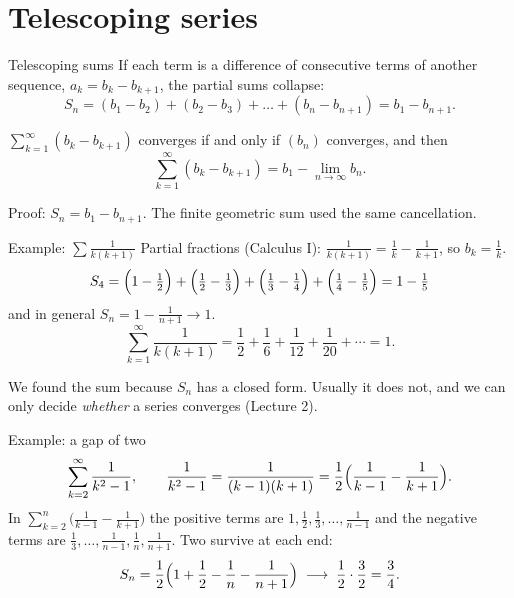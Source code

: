 \documentclass[10pt]{wosm-slides}
\begin{document}
\section{Telescoping series}

\begin{frame}{Telescoping sums}
  If each term is a difference of consecutive terms of another sequence,
  $a_k = b_k - b_{k+1}$, the partial sums collapse:
  \[ S_n = (b_1 - b_2) + (b_2 - b_3) + \dots + (b_n - b_{n+1}) = b_1 - b_{n+1} . \]
  \pause
  \begin{theorem}
    $\sum_{k=1}^\infty (b_k - b_{k+1})$ converges if and only if $(b_n)$ converges, and then
    \[ \sum_{k=1}^\infty (b_k - b_{k+1}) = b_1 - \lim_{n\to\infty} b_n . \]
  \end{theorem}
  {\small Proof: $S_n = b_1 - b_{n+1}$. \quad
  The finite geometric sum used the same cancellation.\par}
\end{frame}

\begin{frame}{Example: $\sum \frac{1}{k(k+1)}$}
  Partial fractions (Calculus I): \quad
  $\displaystyle\frac{1}{k(k+1)} = \frac1k - \frac1{k+1}$, \quad so $b_k = \frac1k$.
  \pause
  \[ S_4 = \Bigl(1 - \tfrac12\Bigr) + \Bigl(\tfrac12 - \tfrac13\Bigr)
         + \Bigl(\tfrac13 - \tfrac14\Bigr) + \Bigl(\tfrac14 - \tfrac15\Bigr)
         = 1 - \tfrac15 \]
  and in general $S_n = 1 - \frac{1}{n+1} \to 1$.
  \pause
  \[ \sum_{k=1}^\infty \frac{1}{k(k+1)} = \frac12 + \frac16 + \frac1{12} + \frac1{20} + \cdots = 1 . \]
  {\small\color{wosm-muted} We found the sum because $S_n$ has a closed form. Usually it does
  not, and we can only decide \emph{whether} a series converges (Lecture 2).\par}
\end{frame}

\begin{frame}{Example: a gap of two}
  \[ \sum_{k=2}^\infty \frac{1}{k^2 - 1}, \qquad
     \frac{1}{k^2-1} = \frac{1}{(k-1)(k+1)} = \frac12\Bigl(\frac{1}{k-1} - \frac{1}{k+1}\Bigr). \]
  \pause
  In $\sum_{k=2}^{n} \bigl(\frac{1}{k-1} - \frac{1}{k+1}\bigr)$ the positive terms are
  $1, \frac12, \frac13, \dots, \frac1{n-1}$ and the negative terms are
  $\frac13, \dots, \frac1{n-1}, \frac1n, \frac1{n+1}$. Two survive at each end:
  \[ S_n = \frac12\Bigl(1 + \frac12 - \frac1n - \frac1{n+1}\Bigr)
     \;\longrightarrow\; \frac12 \cdot \frac32 = \frac34 . \]
\end{frame}
\end{document}
